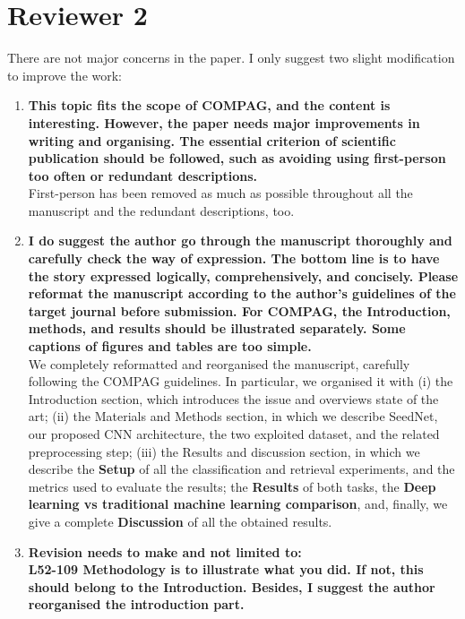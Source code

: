 \documentclass[]{article}
\begin{document}
	\section{Reviewer 2}
	There are not major concerns in the paper. I only suggest two slight modification to improve the work:
	\begin{enumerate}
		\item \textbf{This topic fits the scope of COMPAG, and the content is interesting. However, the paper needs major improvements in writing and organising. The essential criterion of scientific publication should be followed, such as avoiding using first-person too often or redundant descriptions. } \\
		
		First-person has been removed as much as possible throughout all the manuscript and the redundant descriptions, too.
		
		\item \textbf{I do suggest the author go through the manuscript thoroughly and carefully check the way of expression. The bottom line is to have the story expressed logically, comprehensively, and concisely. Please reformat the manuscript according to the author's guidelines of the target journal before submission. For COMPAG, the Introduction, methods, and results should be illustrated separately. Some captions of figures and tables are too simple.} \\
		
		We completely reformatted and reorganised the manuscript, carefully following the COMPAG guidelines. In particular, we organised it with (i) the Introduction section, which introduces the issue and overviews state of the art; (ii) the Materials and Methods section, in which we describe SeedNet, our proposed CNN architecture, the two exploited dataset, and the related preprocessing step; (iii) the Results and discussion section, in which we describe the \textbf{Setup} of all the classification and retrieval experiments, and the metrics used to evaluate the results; the \textbf{Results} of both tasks, the \textbf{Deep learning vs traditional machine learning comparison}, and, finally, we give a complete \textbf{Discussion} of all the obtained results.
	
		\item \textbf{Revision needs to make and not limited to:\\
			L52-109 Methodology is to illustrate what you did. If not, this should belong to the Introduction. Besides, I suggest the author reorganised the introduction part.}
		

\end{enumerate}
\end{document}
